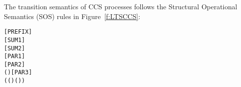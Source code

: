 The transition semantics of CCS processes  follows
the Structural Operational Semantics (SOS) rules in
Figure~\ref{f:LTSCCS}:
\begin{alltt}
\HOLTokenTurnstile{}  \HOLTokenTransBegin{}\HOLTokenTransEnd {}\hfill\texttt{[PREFIX]}
\HOLTokenTurnstile{}  \HOLTokenTransBegin{}\HOLTokenTransEnd {} \HOLSymConst{\HOLTokenImp{}}  \HOLSymConst{+}  \HOLTokenTransBegin{}\HOLTokenTransEnd {}\hfill\texttt{[SUM1]}
\HOLTokenTurnstile{}  \HOLTokenTransBegin{}\HOLTokenTransEnd {} \HOLSymConst{\HOLTokenImp{}}  \HOLSymConst{+}  \HOLTokenTransBegin{}\HOLTokenTransEnd {}\hfill\texttt{[SUM2]}
\HOLTokenTurnstile{}  \HOLTokenTransBegin{}\HOLTokenTransEnd {} \HOLSymConst{\HOLTokenImp{}}  \HOLSymConst{\ensuremath{\parallel}}  \HOLTokenTransBegin{}\HOLTokenTransEnd {} \HOLSymConst{\ensuremath{\parallel}} \hfill\texttt{[PAR1]}
\HOLTokenTurnstile{}  \HOLTokenTransBegin{}\HOLTokenTransEnd {} \HOLSymConst{\HOLTokenImp{}}  \HOLSymConst{\ensuremath{\parallel}}  \HOLTokenTransBegin{}\HOLTokenTransEnd {} \HOLSymConst{\ensuremath{\parallel}} \hfill\texttt{[PAR2]}
\HOLTokenTurnstile{}  \HOLTokenTransBegin{} \HOLTokenTransEnd {} \HOLSymConst{\HOLTokenConj{}}  \HOLTokenTransBegin{} ( )\HOLTokenTransEnd {} \HOLSymConst{\HOLTokenImp{}}  \HOLSymConst{\ensuremath{\parallel}}  \HOLTokenTransBegin\HOLSymConst{\ensuremath{\tau}}\HOLTokenTransEnd {} \HOLSymConst{\ensuremath{\parallel}} \hfill\texttt{[PAR3]}
\HOLTokenTurnstile{}  \HOLTokenTransBegin{}\HOLTokenTransEnd {} \HOLSymConst{\HOLTokenConj{}} (( \HOLSymConst{=} \HOLSymConst{\ensuremath{\tau}}) \HOLSymConst{\HOLTokenDisj{}} ( \HOLSymConst{=}  ) \HOLSymConst{\HOLTokenConj{}}  \HOLSymConst{\HOLTokenNotIn{}}  \HOLSymConst{\HOLTokenConj{}}   \HOLSymConst{\HOLTokenNotIn{}} ) \HOLSymConst{\HOLTokenImp{}}

\end{alltt}

